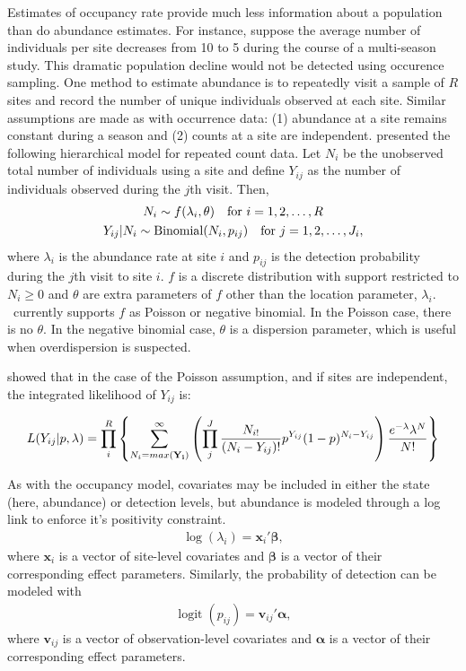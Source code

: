 \documentclass[article,shortnames]{jss}
\DeclareMathOperator{\logit}{logit}
\DeclareMathOperator{\Bin}{Binomial}
\newcommand{\um}{\pkg{unmarked}}
\begin{document}
Estimates of occupancy rate provide much less information about a
population than do abundance estimates. For instance, suppose the
average number of individuals per site decreases from 10 to 5 during
the course of a multi-season study. This dramatic population decline
would not be detected using occurence sampling.  One method to
estimate abundance is to repeatedly visit a sample of $R$ sites and
record the number of unique individuals observed at each site.
Similar assumptions are made as with occurrence data: (1) abundance at
a site remains constant during a season and (2) counts at a site are
independent.  \citet{Royle2004} presented the following hierarchical model for
repeated count data.  Let $N_i$ be the unobserved total number of
individuals using a site and define $Y_{ij}$ as the number of individuals observed
during the $j$th visit.  Then,
\begin{gather}
  N_i \sim f(\lambda_i, \theta) \text{\quad for $i=1,2,\dots,R$} \label{eq:pc2} \\
  Y_{ij}|N_{i} \sim \Bin(N_i, p_{ij})\text{\quad for $j=1,2,\dots,J_{i}$},
\end{gather}
where $\lambda_i$ is the abundance rate at site $i$ and $p_{ij}$ is
the detection probability during the $j$th visit to site $i$.  $f$ is
a discrete distribution with support restricted to $N_{i} \ge 0$ and
$\theta$ are extra parameters of $f$ other than the location
parameter, $\lambda_{i}$.  \um\ currently supports $f$ as Poisson or
negative binomial.  In the Poisson case, there is no $\theta$.  In the
negative binomial case, $\theta$ is a dispersion parameter, which is
useful when overdispersion is suspected.

\citet{Royle2004b} showed that in the case of the Poisson assumption, and if sites are independent, the integrated likelihood of $Y_{ij}$ is:

\begin{equation}
L(Y_{ij}| p,\lambda) = 
 \prod_{i}^{R} 
 \left\{ \sum_{N_{i}=max({\bf Y_i})}^{\infty}
          \left( \prod_{j}^{J} 
     \frac{N_{i!}}{ (N_{i}-Y_{ij})!} p^{Y_{ij}}(1-p)^{N_{i}-Y_{ij}} \right)
       \frac{e^{-\lambda} \lambda^N}{N!} \right\}
\end{equation}


As with the occupancy model, covariates may be included in either the
state (here, abundance) or detection levels, but abundance is modeled
through a log link to enforce it's positivity constraint.
\begin{gather}
  \log(\lambda_i) = \mathbf x_i' \mathbf \beta,
\end{gather}
where $\mathbf x_i$ is a vector of site-level covariates and $\mathbf \beta$
is a vector of their corresponding effect parameters.  Similarly, the
probability of detection can be modeled with
\begin{gather}
  \logit(p_{ij}) = \mathbf v_{ij}' \mathbf \alpha,
\end{gather}
where $\mathbf v_{ij}$ is a vector of observation-level covariates and
$\mathbf \alpha$ is a vector of their corresponding effect parameters.
\end{document}
